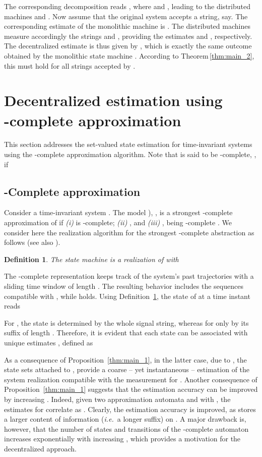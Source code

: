 \documentclass[a4paper, 10pt, conference]{ieeeconf}
\newtheorem{definition}{Definition}
\newcommand{\ie}{\emph{i.e.}}
\begin{document}
The corresponding decomposition reads , where  and , leading to the distributed machines  and . Now assume that the original system accepts a string, say. The corresponding estimate of the monolithic machine is . The distributed machines measure accordingly the strings  and , providing the estimates  and , respectively. The decentralized estimate is thus given by , which is exactly the same outcome obtained by the monolithic state machine . According to Theorem\,\ref{thm:main_2}, this must hold for all strings accepted by  .~\QED


\section{Decentralized estimation using \\-complete approximation}
\label{sec:Application}
This section addresses the set-valued state estimation for time-invariant systems  using the -complete approximation algorithm. Note that  is said to be -complete, \cite{MoRaOY02}, if
\vspace{-4pt}



\subsection{-Complete approximation}
\label{sec:lComplete approximation}
Consider a time-invariant system . The model ), , is a strongest -complete approximation of  if \emph{(i)}  is -complete; \emph{(ii)} , and \emph{(iii)} ,  being -complete .
We consider here the realization algorithm for the strongest -complete abstraction  as follows (see also \cite{wodes2010}).
\begin{definition} \label{def:lcomplete} The state machine  is a realization of  with
\vspace{-5pt}

\end{definition}

The -complete representation keeps track of the system's past trajectories with a sliding time window of length . The resulting behavior  includes the sequences compatible with  , while  holds. Using Definition~\ref{def:lcomplete}, the state  of  at a time instant  reads

For , the state  is determined by the whole signal string, whereas for  only by its suffix of length . Therefore, it is evident that each state  can be associated with unique estimates , defined as

As a consequence of Proposition~\ref{thm:main_1}, in the latter case, due to ,
the state sets attached to , provide a coarse -- yet instantaneous -- estimation of the system realization  compatible with the measurement  for . Another consequence of Proposition~\ref{thm:main_1} suggests that the estimation accuracy can be improved by increasing . Indeed, given two approximation automata  and   with , the estimates for  correlate as .
Clearly, the estimation accuracy is improved, as  stores a larger content of information (\ie\, a longer suffix) on . A major drawback is, however, that the number of states and transitions of the -complete automaton increases exponentially with increasing  , which provides a motivation for the decentralized approach.
\end{document}

